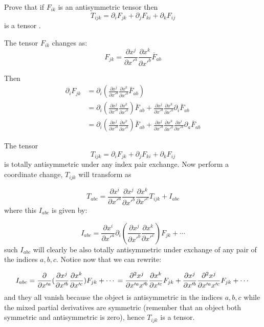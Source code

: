 \begin{example}
 Prove that if $F_{ik}$ is an antisymmetric tensor then
$$
T_{ijk}= \partial_i F_{jk} + \partial_{j}F_{ki} +\partial_{k}F_{ij}
$$
is a tensor .
 
\end{example}

\begin{solu}

The tensor $F_{ik}$ changes as:
\[F_{jk} = \frac{\partial x^j}{\partial x'^a}\frac{\partial x^k}{\partial x'^b} \bar{F}_{ab}\]

Then 
\begin{align}
 \partial_i F_{jk}  &= \partial_i  \left( \frac{\partial x^j}{\partial x'^a}\frac{\partial x^k}{\partial x'^b} \bar{F}_{ab} \right)\\
 &= \partial_i  \left( \frac{\partial x^j}{\partial x'^a}\frac{\partial x^k}{\partial x'^b}\right)\bar{F}_{ab}+ \frac{\partial x^j}{\partial x'^a}\frac{\partial x^k}{\partial x'^b}  \partial_i \bar{F}_{ab}\\
 &= \partial_i  \left( \frac{\partial x^j}{\partial x'^a}\frac{\partial x^k}{\partial x'^b}\right)\bar{F}_{ab}+ \frac{\partial x^j}{\partial x'^a}\frac{\partial x^k}{\partial x'^b} \frac{\partial x^i}{\partial x'^a}  \partial_a \bar{F}_{ab}
\end{align}



 
The tensor 
$$
T_{ijk}= \partial_i F_{jk} + \partial_{j}F_{ki} +\partial_{k}F_{ij}
$$
is totally antisymmetric under any index pair exchange. Now perform a coordinate change, $T_{ijk}$ will transform as

$$
T_{abc} = \frac{\partial x^i }{\partial x'^a}\frac{\partial x^j }{\partial x'^b}\frac{\partial x^k }{\partial x'^c}T_{ijk} + I_{abc}
$$
where this $I_{abc}$ is  given by:

$$
I_{abc} = \frac{\partial x^i}{\partial x'^a}\partial_i (\frac{\partial x^j}{\partial x'^b}\frac{\partial x^k}{\partial x'^c}) F_{jk} + \cdots
$$
such $I_{abc}$ will clearly be also totally antisymmetric under exchange of any pair of the indices $a,b,c$. Notice now that we can rewrite:

$$
I_{abc} = \frac{\partial }{\partial x'^a}(\frac{\partial x^j}{\partial x'^b}\frac{\partial x^k}{\partial x'^c}) F_{jk} + \cdots \\
=\frac{\partial^2 x^j}{\partial x'^a x'^b}\frac{\partial x^k}{\partial x'^c} F_{jk}  + \frac{\partial x^j}{\partial x'^b} \frac{\partial^2 x^j}{\partial x'^a x'^c} F_{jk} + \cdots  
$$
and they all vanish because the object is antisymmetric in the indices $a,b,c$ while the mixed partial derivatives are symmetric (remember that an object both symmetric and antisymmetric is zero), hence $T_{ijk}$ is a tensor.
\end{solu}

